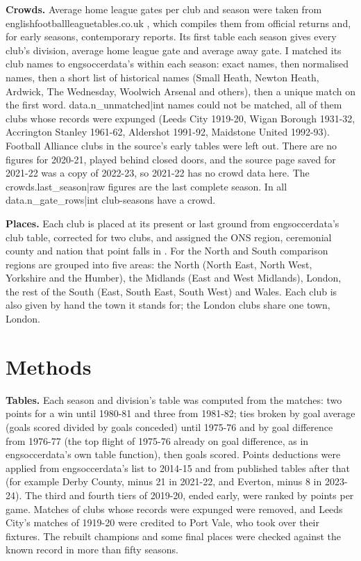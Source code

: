 \documentclass[11pt,a4paper]{article}
\begin{document}
\textbf{Crowds.} Average home league gates per club and season were taken from englishfootballleaguetables.co.uk \citep{eflt}, which compiles them from official returns and, for early seasons, contemporary reports. Its first table each season gives every club's division, average home league gate and average away gate. I matched its club names to engsoccerdata's within each season: exact names, then normalised names, then a short list of historical names (Small Heath, Newton Heath, Ardwick, The Wednesday, Woolwich Arsenal and others), then a unique match on the first word. {{data.n_unmatched|int}} names could not be matched, all of them clubs whose records were expunged (Leeds City 1919-20, Wigan Borough 1931-32, Accrington Stanley 1961-62, Aldershot 1991-92, Maidstone United 1992-93). Football Alliance clubs in the source's early tables were left out. There are no figures for 2020-21, played behind closed doors, and the source page saved for 2021-22 was a copy of 2022-23, so 2021-22 has no crowd data here. The {{crowds.last_season|raw}} figures are the last complete season. In all {{data.n_gate_rows|int}} club-seasons have a crowd.

\textbf{Places.} Each club is placed at its present or last ground from engsoccerdata's club table, corrected for two clubs, and assigned the ONS region, ceremonial county and nation that point falls in \citep{ons}. For the North and South comparison regions are grouped into five areas: the North (North East, North West, Yorkshire and the Humber), the Midlands (East and West Midlands), London, the rest of the South (East, South East, South West) and Wales. Each club is also given by hand the town it stands for; the London clubs share one town, London.

\section{Methods}
\textbf{Tables.} Each season and division's table was computed from the matches: two points for a win until 1980-81 and three from 1981-82; ties broken by goal average (goals scored divided by goals conceded) until 1975-76 and by goal difference from 1976-77 (the top flight of 1975-76 already on goal difference, as in engsoccerdata's own table function), then goals scored. Points deductions were applied from engsoccerdata's list to 2014-15 and from published tables after that (for example Derby County, minus 21 in 2021-22, and Everton, minus 8 in 2023-24). The third and fourth tiers of 2019-20, ended early, were ranked by points per game. Matches of clubs whose records were expunged were removed, and Leeds City's matches of 1919-20 were credited to Port Vale, who took over their fixtures. The rebuilt champions and some final places were checked against the known record in more than fifty seasons.
\end{document}
